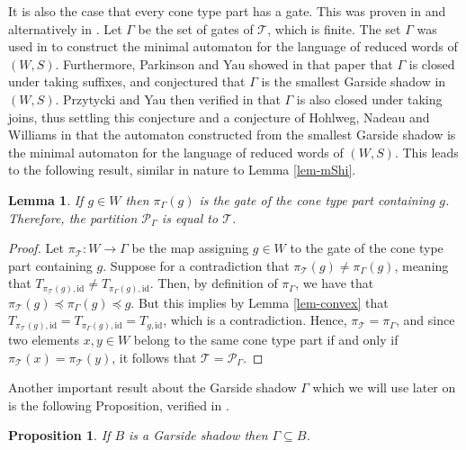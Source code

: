\documentclass[a4paper,12pt,leqno]{amsart}
\newtheorem{lemma}[theorem]{Lemma}
\newtheorem{prop}[theorem]{Proposition}
\theoremstyle{definition}
\newcommand{\id}{\text{id}}
\begin{document}
It is also the case that every cone type part has a gate. This was proven in \cite[Thm 1]{PaY-reg} and alternatively in \cite{PrY-pair}. Let $\Gamma$ be the set of gates of $\mathscr{T}$, which is finite. The set $\Gamma$ was used in \cite{PaY-reg} to construct the minimal automaton for the language of reduced words of $(W,S)$. Furthermore, Parkinson and Yau showed in that paper that $\Gamma$ is closed under taking suffixes, and conjectured that $\Gamma$ is the smallest Garside shadow in $(W,S)$. Przytycki and Yau then verified in \cite{PrY-pair} that $\Gamma$ is also closed under taking joins, thus settling this conjecture and a conjecture of Hohlweg, Nadeau and Williams in \cite{HNW-Gar} that the automaton constructed from the smallest Garside shadow is the minimal automaton for the language of reduced words of $(W,S)$. This leads to the following result, similar in nature to Lemma \ref{lem-mShi}.

\begin{lemma} \label{lem-cone}
    If $g \in W$ then $\pi_{\Gamma}(g)$ is the gate of the cone type part containing $g$. Therefore, the partition $\mathscr{P}_{\Gamma}$ is equal to $\mathscr{T}$.
\end{lemma}

\begin{proof}
    Let $\pi_{\mathscr{T}} : W \to \Gamma$ be the map assigning $g \in W$ to the gate of the cone type part containing $g$. Suppose for a contradiction that $\pi_{\mathscr{T}}(g) \neq \pi_{\Gamma}(g)$, meaning that $T_{\pi_{\mathscr{T}}(g), \id} \neq T_{\pi_{\Gamma}(g), \id}$. Then, by definition of $\pi_{\Gamma}$, we have that $\pi_{\mathscr{T}}(g) \preceq \pi_{\Gamma}(g) \preceq g$. But this implies by Lemma \ref{lem-convex} that $T_{\pi_{\mathscr{T}}(g), \id} = T_{\pi_{\Gamma}(g), \id} = T_{g,\id}$, which is a contradiction. Hence, $\pi_{\mathscr{T}} = \pi_{\Gamma}$, and since two elements $x,y \in W$ belong to the same cone type part if and only if $\pi_{\mathscr{T}}(x) = \pi_{\mathscr{T}}(y)$, it follows that $\mathscr{T} = \mathscr{P}_{\Gamma}$. 
\end{proof}

Another important result about the Garside shadow $\Gamma$ which we will use later on is the following Proposition, verified in \cite[Prop 4.29]{PaY-reg}.

\begin{prop} \label{cone type garside}
    If $B$ is a Garside shadow then $\Gamma \subseteq B$. 
\end{prop}
\end{document}
